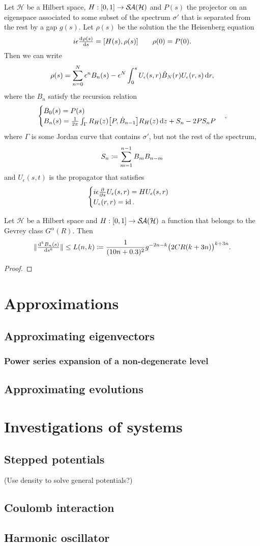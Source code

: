 \begin{proposition}
Let $\mathcal{H}$ be a Hilbert space, $H: \interval{0,1}\to \SelfAdjoints(\mathcal{H})$ and $P(s)$ the projector on an eigenspace associated to some subset of the spectrum $\sigma'$ that is separated from the rest by a gap $g(s)$. Let $\rho(s)$ be the solution the the Heisenberg equation
\[ i\epsilon \od{\rho(s)}{s} = [H(s), \rho(s)] \qquad \rho(0)= P(0). \]
Then we can write
\[ \rho(s) = \sum_{n=0}^N \epsilon^nB_n(s) - \epsilon^N\int_0^s U_\epsilon(s,r)\dot{B}_N(r)U_\epsilon(r,s) \operatorname{d \!}{r}, \]
where the $B_n$ satisfy the recursion relation
\[ \begin{cases}
B_0(s) = P(s) \\
B_n(s) = \frac{1}{2\pi}\int_\Gamma R_H(z)\big[P, \dot{B}_{n-1}\big]R_H(z) \operatorname{d \!}{z} + S_n - 2PS_nP
\end{cases}, \]
where $\Gamma$ is some Jordan curve that contains $\sigma'$, but not the rest of the spectrum,
\[ S_n \coloneqq \sum_{m=1}^{n-1}B_mB_{n-m} \]
and $U_\epsilon(s,t)$ is the propagator that satisfies
\[ \begin{cases}
i\epsilon  \frac{\partial{^{}}}{\partial{{s}^{}}} U_\epsilon(s,r) = HU_\epsilon(s,r) \\
U_\epsilon(r,r) = \operatorname{id}.
\end{cases} \]
\end{proposition}

\begin{lemma}
Let $\mathcal{H}$ be a Hilbert space and $H: \interval{0,1}\to \SelfAdjoints(\mathcal{H})$ a function that belongs to the Gevrey class $G^\alpha(R)$. Then
\[ \norm{\od[k]{B_n(s)}{s}} \leq L(n,k) \defeq \frac{1}{(10n + 0.3)^2}g^{-2n-k}\big(2CR(k+3n)\big)^{k+3n}. \]
\end{lemma}
\begin{proof}

\end{proof}

\chapter{Approximations}
\section{Approximating eigenvectors}
\subsection{Power series expansion of a non-degenerate level}

\section{Approximating evolutions}

\chapter{Investigations of systems}
\section{Stepped potentials}
(Use density to solve general potentials?)
\section{Coulomb interaction}
\section{Harmonic oscillator}